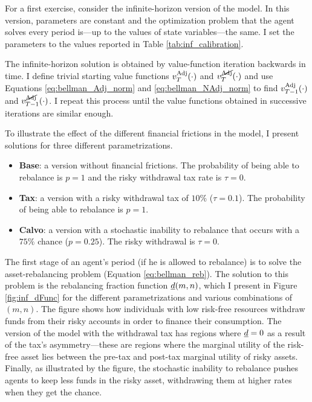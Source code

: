 \documentclass[./RiskyContrib.tex]{subfiles}
\begin{document}
For a first exercise, consider the infinite-horizon version of
the model. In this version, parameters are constant and the
optimization problem that the agent solves every period
is---up to the values of state variables---the same. I set
the parameters to the values reported in Table \ref{tab:inf_calibration}.



The infinite-horizon solution is obtained by value-function iteration
backwards in time. I define trivial starting value functions $v^{\text{Adj}}_T(\cdot)$
and $v^{\cancel{\text{Adj}}}_T(\cdot)$ and use Equations \ref{eq:bellman_Adj_norm} and
\ref{eq:bellman_NAdj_norm} to find $v^{\text{Adj}}_{T-1}(\cdot)$ and $v^{\cancel{\text{Adj}}}_{T-1}(\cdot)$.
I repeat this process until the value functions obtained in successive
iterations are similar enough.

To illustrate the effect of the different financial frictions in the
model, I present solutions for three different parametrizations.
\begin{itemize}
\item \textbf{Base}: a version without financial frictions. The probability
of being able to rebalance is $p = 1$ and the risky withdrawal tax rate is $\tau = 0$.
\item \textbf{Tax}: a version with a risky withdrawal tax of $10\%$ ($\tau = 0.1$).
The probability of being able to rebalance is $p = 1$.
\item \textbf{Calvo}: a version with a stochastic inability to rebalance that
occurs with a $75\%$ chance ($p = 0.25$). The risky withdrawal is $\tau = 0$.
\end{itemize}



The first stage of an agent's period (if he is allowed to rebalance) is to
solve the asset-rebalancing problem (Equation \ref{eq:bellman_reb}). The solution
to this problem is the rebalancing fraction function $\underline{d}(m,n)$, which I present
in Figure \ref{fig:inf_dFunc} for the different parametrizations and various
combinations of $(m,n)$. The figure shows how individuals with low risk-free resources
withdraw funds from their risky accounts in order to finance their consumption.
The version of the model with the withdrawal tax has regions where $\underline{d} = 0$ as
a result of the tax's asymmetry---these are regions where the marginal utility of the
risk-free asset lies between the pre-tax and post-tax marginal utility of risky assets.
Finally, as illustrated by the figure, the stochastic inability to rebalance pushes agents to
keep less funds in the risky asset, withdrawing them at higher rates when they get the chance.
\end{document}
